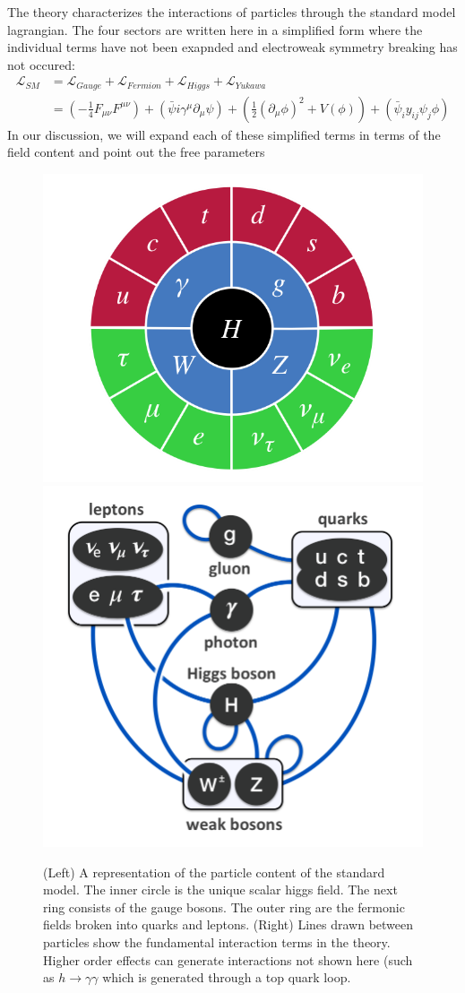 The theory  characterizes the interactions of particles through the standard model lagrangian. 
The four sectors are written here in a simplified form where the individual terms have not been 
exapnded and electroweak symmetry breaking has not occured: 
\begin{align*}
\mathcal{L}_{SM} &= \mathcal{L}_{Gauge} + \mathcal{L}_{Fermion} + \mathcal{L}_{Higgs} + \mathcal{L}_{Yukawa}\\
&=\left(-\frac{1}{4} F_{\mu\nu}F^{\mu\nu} \right )
  + \left (\bar\psi i\gamma^\mu \partial_\mu \psi \right) +
 \left(\frac{1}{2}(\partial_\mu \phi)^2 + V(\phi) \right) + \left(\bar \psi_i y_{ij} \psi_j \phi \right ) 
\end{align*}
In our discussion, we will expand each of these simplified terms in terms of the field content and point out
the free parameters
\begin{figure}
\begin{center}
\includegraphics[width=.45\textwidth]{pics/sm_model_particles}
\includegraphics[width=.45\textwidth]{pics/principal_interactions}
\caption{ (Left) A representation of the particle content of the standard model. 
The inner circle is the unique scalar higgs field. The next ring consists of the 
gauge bosons. The outer ring are the fermonic fields broken into quarks and leptons. (Right) Lines drawn between particles show the fundamental interaction terms in the theory. Higher order effects can generate interactions not shown here (such as $h\rightarrow \gamma\gamma$ which is generated through a top quark loop.}
\end{center}
\end{figure}

